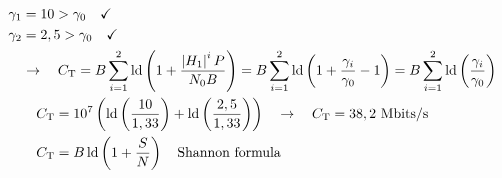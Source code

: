 \begin{align*}
	&\gamma_{1}=10>\gamma_{0}\quad\checkmark& \\
	&\gamma_{2}=2,5>\gamma_{0}\quad\checkmark& \\
	&\quad\rightarrow\quad C_{\mathrm{T}}=B\sum\limits_{i=1}^{2}\operatorname{ld}\left(1+\frac{\left|H_{1}\right|^{i}P}{N_{0}B}\right)=B\sum\limits_{i=1}^{2}\operatorname{ld}\left(1+\frac{\gamma_{i}}{\gamma_{0}}-1\right)=B\sum\limits_{i=1}^{2}\operatorname{ld}\left(\frac{\gamma_{i}}{\gamma_{0}}\right)& \\
	&\qquad C_{\mathrm{T}}=10^{7}\left(\operatorname{ld}\left(\frac{10}{1,33}\right)+\operatorname{ld}\left(\frac{2,5}{1,33}\right)\right)\quad\rightarrow\quad C_{\mathrm{T}}=38,2\text{ Mbits/s}& \\
	&\qquad C_{\mathrm{T}}=B\operatorname{ld}\left(1+\frac{S}{N}\right)\quad\text{Shannon formula}& \\
\end{align*}